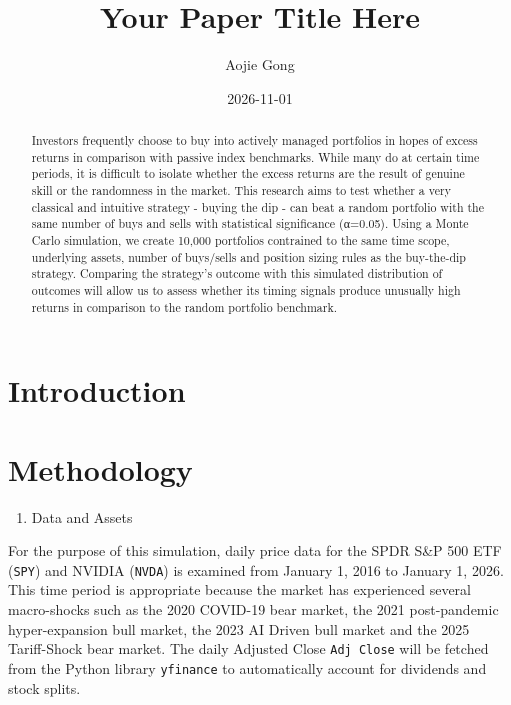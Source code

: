 \documentclass[
  11pt,
]{article}
\title{Your Paper Title Here}
\author{Aojie Gong}
\date{2026-11-01}
\providecommand{\tightlist}{%
  \setlength{\itemsep}{0pt}\setlength{\parskip}{0pt}}
\begin{document}
\maketitle
\begin{abstract}
Investors frequently choose to buy into actively managed portfolios in
hopes of excess returns in comparison with passive index benchmarks.
While many do at certain time periods, it is difficult to isolate
whether the excess returns are the result of genuine skill or the
randomness in the market. This research aims to test whether a very
classical and intuitive strategy - buying the dip - can beat a random
portfolio with the same number of buys and sells with statistical
significance (α=0.05). Using a Monte Carlo simulation, we create 10,000
portfolios contrained to the same time scope, underlying assets, number
of buys/sells and position sizing rules as the buy-the-dip strategy.
Comparing the strategy's outcome with this simulated distribution of
outcomes will allow us to assess whether its timing signals produce
unusually high returns in comparison to the random portfolio benchmark.
\end{abstract}


\section{Introduction}\label{introduction}

\section{Methodology}\label{methodology}

\begin{enumerate}
\def\labelenumi{\arabic{enumi}.}
\tightlist
\item
  Data and Assets
\end{enumerate}

For the purpose of this simulation, daily price data for the SPDR S\&P
500 ETF (\texttt{SPY}) and NVIDIA (\texttt{NVDA}) is examined from
January 1, 2016 to January 1, 2026. This time period is appropriate
because the market has experienced several macro-shocks such as the 2020
COVID-19 bear market, the 2021 post-pandemic hyper-expansion bull
market, the 2023 AI Driven bull market and the 2025 Tariff-Shock bear
market. The daily Adjusted Close \texttt{Adj\ Close} will be fetched
from the Python library \texttt{yfinance} to automatically account for
dividends and stock splits.
\end{document}
